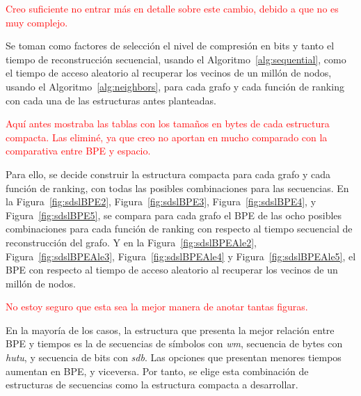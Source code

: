 \textcolor{red}{Creo suficiente no entrar más en detalle sobre este cambio, debido a que no es muy complejo.}

Se toman como factores de selección el nivel de compresión en bits y tanto el tiempo de reconstrucción secuencial, usando el Algoritmo~\ref{alg:sequential}, como el tiempo de acceso aleatorio al recuperar los vecinos de un millón de nodos, usando el Algoritmo~\ref{alg:neighbors}, para cada grafo y cada función de ranking con cada una de las estructuras antes planteadas.

%
%
%
%
\textcolor{red}{Aquí antes mostraba las tablas con los tamaños en bytes de cada estructura compacta. Las eliminé, ya que creo no aportan en mucho comparado con la comparativa entre BPE y espacio.}

Para ello, se decide construir la estructura compacta para cada grafo y cada función de ranking, con todas las posibles combinaciones para las secuencias. En la Figura~\ref{fig:sdslBPE2}, Figura~\ref{fig:sdslBPE3}, Figura~\ref{fig:sdslBPE4}, y Figura~\ref{fig:sdslBPE5}, se compara para cada grafo el BPE de las ocho posibles combinaciones para cada función de ranking con respecto al tiempo secuencial de reconstrucción del grafo. Y en la Figura~\ref{fig:sdslBPEAle2}, Figura~\ref{fig:sdslBPEAle3}, Figura~\ref{fig:sdslBPEAle4} y Figura~\ref{fig:sdslBPEAle5}, el BPE con respecto al tiempo de acceso aleatorio al recuperar los vecinos de un millón de nodos.

\textcolor{red}{No estoy seguro que esta sea la mejor manera de anotar tantas figuras.}

En la mayoría de los casos, la estructura que presenta la mejor relación entre BPE y tiempos es la de secuencias de símbolos con \textit{wm}, secuencia de bytes con \textit{hutu}, y secuencia de bits con \textit{sdb}.  Las opciones que presentan menores tiempos aumentan en BPE, y viceversa. Por tanto, se elige esta combinación de estructuras de secuencias como la estructura compacta a desarrollar.

